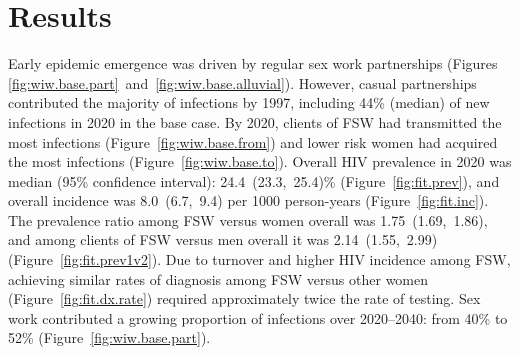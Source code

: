 \section{Results}\label{art.res}
Early epidemic emergence was driven by regular sex work partnerships
(Figures \ref{fig:wiw.base.part}~and~\ref{fig:wiw.base.alluvial}).
However, casual partnerships contributed the majority of infections by 1997, %
including 44\% (median) of new infections in 2020 in the base case. %
By 2020, clients of FSW had transmitted the most infections (Figure~\ref{fig:wiw.base.from})
and lower risk women had acquired the most infections (Figure~\ref{fig:wiw.base.to}).
Overall HIV prevalence in 2020 was median (95\% confidence interval):
24.4~(23.3,~25.4)\% (Figure~\ref{fig:fit.prev}), %
and overall incidence was 8.0~(6.7,~9.4) per 1000 person-years (Figure~\ref{fig:fit.inc}).
The prevalence ratio among FSW versus women overall was 1.75~(1.69,~1.86), %
and among clients of FSW versus men overall it was 2.14~(1.55,~2.99) %
(Figure~\ref{fig:fit.prev1v2}).
Due to turnover and higher HIV incidence among FSW,
achieving similar rates of diagnosis among FSW versus other women (Figure~\ref{fig:fit.dx.rate})
required approximately twice the rate of testing. %
Sex work contributed a growing proportion of infections
over 2020--2040: from 40\% to 52\% (Figure~\ref{fig:wiw.base.part}). %
